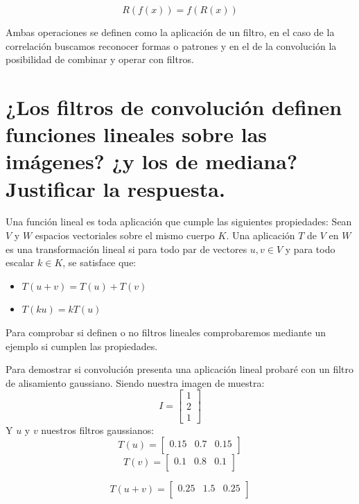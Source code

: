 \documentclass{article}
\begin{document}
\begin{equation}
R(f(x)) = f(R(x))
\end{equation}


Ambas operaciones se definen como la aplicación de un filtro, en el caso de la correlación buscamos reconocer formas o patrones y en el de la convolución la posibilidad de combinar y operar con filtros.


\section{¿Los filtros de convolución definen funciones lineales sobre las imágenes? ¿y los de mediana? Justificar la respuesta.}
Una función lineal es toda aplicación que cumple las siguientes propiedades:
Sean $V$ y $W$ espacios vectoriales sobre el mismo cuerpo  $K$. Una aplicación $T$ de $V$ en $W$ es una transformación lineal si para todo par de vectores $ u,v\in V$  y para todo escalar $k\in K$, se satisface que:
\begin{itemize}
\item $T(u+v)=T(u)+T(v)$
\item $T(ku)=kT(u)$
\end{itemize}

Para comprobar si definen o no filtros lineales comprobaremos mediante un ejemplo si cumplen las propiedades.

Para demostrar si convolución presenta una aplicación lineal probaré con  un filtro de alisamiento gaussiano.
Siendo nuestra imagen de muestra:
\begin{equation}
I=\begin{bmatrix}
1 \\ 
2 \\ 
1
\end{bmatrix}
\end{equation}
Y $u$ y $v$ nuestros filtros gaussianos:
\begin{equation}
T(u)=\begin{bmatrix}
0.15 & 0.7 & 0.15 \\ 
\end{bmatrix}
\end{equation}
\begin{equation}
T(v)=\begin{bmatrix}
0.1 & 0.8 & 0.1 \\ 
\end{bmatrix}
\end{equation}

\begin{equation}
T(u+v)=\begin{bmatrix}
0.25 & 1.5 & 0.25 \\ 
\end{bmatrix}
\end{equation} \\
\end{document}
